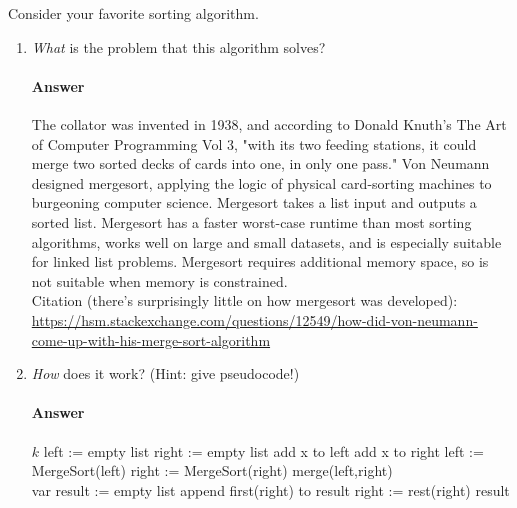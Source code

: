 \documentclass{article}
\begin{document}
Consider your favorite sorting algorithm.
\begin{enumerate}
    \item \emph{What} is the problem that this algorithm solves?

        \paragraph{Answer}{The collator was invented in 1938, and according to Donald Knuth's The Art of Computer Programming Vol 3, "with its two feeding stations, it could merge two sorted decks of cards into one, in only one pass." Von Neumann designed mergesort, applying the logic of physical card-sorting machines to burgeoning computer science. Mergesort takes a list input and outputs a sorted list. Mergesort has a faster worst-case runtime than most sorting algorithms, works well on large and small datasets, and is especially suitable for linked list problems. Mergesort requires additional memory space, so is not suitable when memory is constrained.}
\\Citation (there's surprisingly little on how mergesort was developed): \url{https://hsm.stackexchange.com/questions/12549/how-did-von-neumann-come-up-with-his-merge-sort-algorithm}

    \item \emph{How} does it work? (Hint: give pseudocode!)

        \paragraph{Answer}
        \begin{algorithmic}
	 
	    \State \Return $k$
	\EndIf
	\State left := empty list
	\State right := empty list
	\State add x to left
	\Else
	\State add x to right
	\EndIf
	\EndFor
	\State left := MergeSort(left)
	\State right := MergeSort(right)
	\State \Return merge(left,right)
	\EndFunction
	\\
	\State var result := empty list
	\Else
	\State append first(right) to result
	\State right := rest(right)
	\EndIf
	\EndWhile
	\EndWhile
	\EndWhile
	\State \Return result
	\EndFunction 
	\end{algorithmic}


\end{enumerate}
\end{document}
